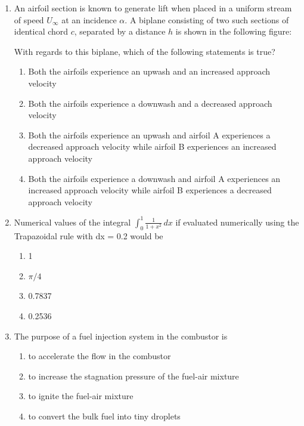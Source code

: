 \documentclass{article}
\begin{document}
\begin{enumerate}
    \item An airfoil section is known to generate lift when placed in a uniform stream of speed $U_\infty$ at an incidence $\alpha$. A biplane consisting of two such sections of identical chord $c$, separated by a distance $h$ is shown in the following figure:
    \begin{figure}[H]
        \centering
        
        \caption{}
        \label{}
    \end{figure}
    With regards to this biplane, which of the following statements is true?
    \begin{enumerate}
        \item Both the airfoils experience an upwash and an increased approach velocity
        \item Both the airfoils experience a downwash and a decreased approach velocity
        \item Both the airfoils experience an upwash and airfoil A experiences a decreased approach velocity while airfoil B experiences an increased approach velocity
        \item Both the airfoils experience a downwash and airfoil A experiences an increased approach velocity while airfoil B experiences a decreased approach velocity
    \end{enumerate}

    \item Numerical values of the integral 
    $\int_{0}^{1} \frac{1}{1 + x^2}\,dx$ if evaluated numerically using the Trapazoidal rule with dx = 0.2 would be
    \begin{multicols}{4}
    \begin{enumerate}
        \item 1
        \item $\pi/4$
        \item 0.7837
        \item 0.2536
    \end{enumerate}
    \end{multicols}

    \item The purpose of a fuel injection system in the combustor is
    \begin{enumerate}
        \item to accelerate the flow in the combustor
        \item to increase the stagnation pressure of the fuel-air mixture
        \item to ignite the fuel-air mixture
        \item to convert the bulk fuel into tiny droplets
    \end{enumerate}


\end{enumerate}
\end{document}

